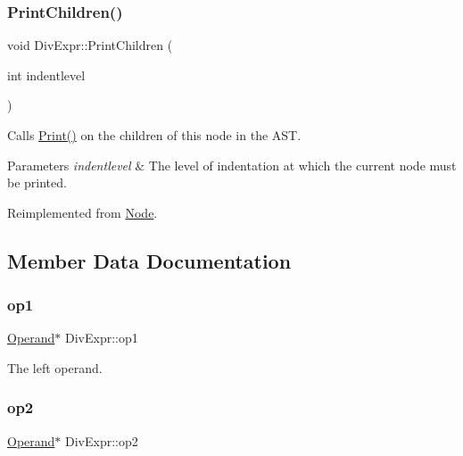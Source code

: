 \mbox{\label{class_div_expr_aa1cdd3697a8229c022827a041e4ac1be}} 
\subsubsection{\texorpdfstring{Print\+Children()}{PrintChildren()}}
{\footnotesize\ttfamily void Div\+Expr\+::\+Print\+Children (\begin{DoxyParamCaption}\item[{int}]{indentlevel }\end{DoxyParamCaption})\hspace{0.3cm}{\ttfamily [virtual]}}

Calls \hyperlink{class_node_a9ef727fd72d1a37792b3db60a8a479dd}{Print()} on the children of this node in the A\+ST. 
\begin{DoxyParams}{Parameters}
{\em indentlevel} & The level of indentation at which the current node must be printed. \\
\hline
\end{DoxyParams}


Reimplemented from \hyperlink{class_node_a3e67ec8d22182b721717af14fe0c3000}{Node}.



\subsection{Member Data Documentation}
\mbox{\label{class_div_expr_a2d2f63a712f0f049ab9c9317c70c7488}} 
\subsubsection{\texorpdfstring{op1}{op1}}
{\footnotesize\ttfamily \hyperlink{class_operand}{Operand}$\ast$ Div\+Expr\+::op1\hspace{0.3cm}{\ttfamily [protected]}}

The left operand. \mbox{\label{class_div_expr_a06cd348b836216c118b2a769be1d6bb8}} 
\subsubsection{\texorpdfstring{op2}{op2}}
{\footnotesize\ttfamily \hyperlink{class_operand}{Operand}$\ast$ Div\+Expr\+::op2\hspace{0.3cm}{\ttfamily [protected]}}

